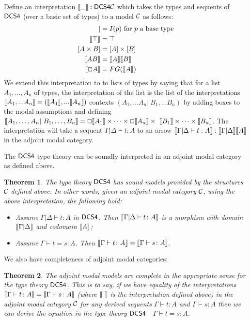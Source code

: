 \documentclass{article}
\let\to\relax
\newcommand{\to}{\rightarrow}
\renewcommand{\Box}{\oblong}
\def\sem#1{[\hspace{-0.05cm}[#1]\hspace{-0.05cm}]}
\newtheorem{theorem}{Theorem}
\begin{document}
\iffalse
Define an interpretation $\sem{\_} : \sf{DCS4} \to {\cal C}$ which takes the types and sequents of $\sf{DCS4}$ (over a basic 
set of types)  to a model $\cal C$ as follows:
\begin{align*}
\sem{p} &= I(p) \mbox{  for $p$ a base type}\\
\sem{\top} &= \top\\
[A\times B] &= [A]\times [B]\\
\sem{  A \to B  } &=  \sem{ A}  \to  \sem{ B }\\
\sem{\Box A} &= F G(\sem{A})
\end{align*}
 We extend this interpretation to 
 to lists of types by saying that for a list $A_1, ..., A_n$ of types,
 the interpretation of the list is the list of the interpretations
 $\sem{A_1,...A_n} = (\sem{A_1}, . . . \sem{A_n})$ 
contexts $(A_1,...A_n | \ B_1,...B_n)$ by adding boxes to the modal
assumptions and defining
$ \sem{A_1,\ldots, A_n |\  B_1,\ldots,B_n} = 
\Box \sem{A_1}\times \cdots \times \Box \sem{A_n} \times
\  \sem{B_1}\times \cdots \times\sem{B_n} $.
The interpretation will take a sequent $\Gamma|\Delta \vdash t : A$ to an arrow 
$ \sem {\Gamma|\Delta \vdash t : A} : \sem{ \Gamma|\Delta} \to \sem{A} $
in the adjoint modal category.

The $\sf{DCS4}$ type theory can be soundly interpreted in an adjoint modal category as defined above.
\begin{theorem}
\label{thm:dcs4-sound}
The type theory $\sf{DCS4}$  has  \textit{sound} models provided by the structures $\cal C$ defined above.
In other words, given an adjoint modal category $\cal C$, using the above interpretation, the following hold:
\begin{itemize}
\item Assume $\Gamma|\Delta \vdash t : A$ in $\sf{DCS4}$. Then $\sem{\Gamma |
    \Delta \vdash t \colon A}$ is a morphism  with domain
  $\sem{\Gamma | \Delta}$ and codomain $\sem{A}$;
\item Assume $\Gamma \vdash t = s \colon A$. Then $\sem{\Gamma
  \vdash t \colon A} = \sem{\Gamma \vdash s \colon A}$.
\end{itemize}
\end{theorem}

We also have completeness of adjoint modal categories:
\begin{theorem}
\label{thm:diml-completeness}
The adjoint modal models are \textit{complete} in the appropriate sense for the type theory $\sf{DCS4}$. This is to say, if
we have equality of the interpretations $\sem{\Gamma \vdash t \colon A} = \sem{\Gamma  \vdash s \colon A}$
 (where \mbox{$\sem{\ } $} is the interpretation defined above)
 in the
adjoint modal category $\cal C$
   for any derived sequents $\Gamma \vdash t \colon A$
 and $\Gamma \vdash s \colon A$ 
 then we can derive the  equation in the type theory $\sf{DCS4}$ $\;$
 $\Gamma \vdash t = s \colon A$. 
\end{theorem}
\end{document}
